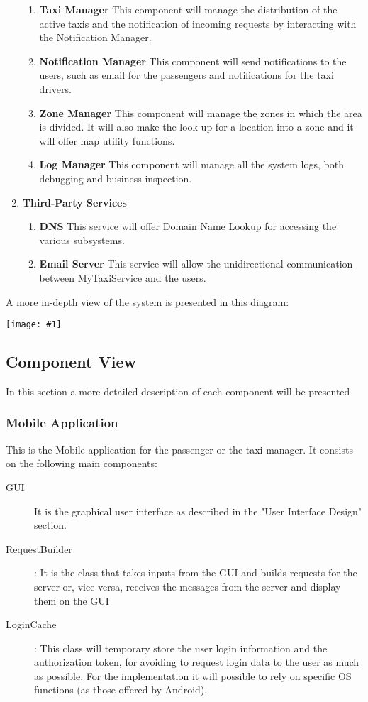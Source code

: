\documentclass[11pt, a4paper,titlepage]{article}
\newcommand{\productname}{MyTaxiService }
\newcommand{\image}[1]{
	\begin{center}
		\noindent \texttt{[image: \#1]}
	\end{center}
	}
\begin{document}
\begin{enumerate}
\begin{enumerate}
		 		\item \label{itm:Component_TaxiManager} \textbf{Taxi Manager} This component will manage the distribution of the active taxis and the notification of incoming requests by interacting with the Notification Manager.
		 		\item \label{itm:Component_NotificationManager} \textbf{Notification Manager} This component will send notifications to the users, such as email for the passengers and notifications for the taxi drivers.
		 		\item \label{itm:Component_ZoneManager} \textbf{Zone Manager} This component will manage the zones in which the area is divided. It will also make the look-up for a location into a zone and it will offer map utility functions.
		 		\item \label{itm:Component_LogManager} \textbf{Log Manager} This component will manage all the system logs, both debugging and business inspection.
		 	\end{enumerate}
 	\item \textbf{Third-Party Services}
 	\begin{enumerate}
 		\item \label{itm:Component_DNS} \textbf{DNS} This service will offer Domain Name Lookup for accessing the various subsystems.
 		\item \label{itm:Component_EmailServer} \textbf{Email Server} This service will allow the unidirectional communication between \productname and the users.
 	\end{enumerate}
 \end{enumerate}
 \newpage
 A more in-depth view of the system is presented in this diagram: \newline
  \image{diagram_class_general.png}
\subsection{Component View}
In this section a more detailed description of each component will be presented
 \subsubsection{Mobile Application}
	 This is the Mobile application for the passenger or the taxi manager. It consists on the following main components:
	 \begin{description}
	 	\item[GUI] It is the graphical user interface as described in the "User Interface Design" section.
	 	\item[RequestBuilder]: It is the class that takes inputs from the GUI and builds requests for the server or, vice-versa, receives the messages from the server and display them on the GUI
	 	\item[LoginCache]: This class will temporary store the user login information and the authorization token, for avoiding to request login data to the user as much as possible. For the implementation it will possible to rely on specific OS functions (as those offered by Android).
	 \end{description}
\end{document}
